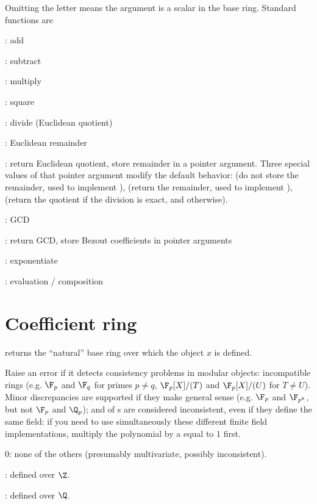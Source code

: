 \noindent Omitting the letter means the argument is a scalar in the base
ring. Standard functions  are

  : add

  : subtract

  : multiply

  : square

  : divide (Euclidean quotient)

  : Euclidean remainder

  : return Euclidean quotient, store remainder in a pointer
argument. Three special values of that pointer argument modify the default
behavior:  (do not store the remainder, used to implement
),  (return the remainder, used to implement
),  (return the quotient if the division is exact,
and  otherwise).

  : GCD

  : return GCD, store Bezout coefficients in pointer arguments

  : exponentiate

  : evaluation / composition

\section{Coefficient ring}

 returns
the ``natural'' base ring over which the object $x$ is defined.

Raise an error if it detects consistency problems in modular objects:
incompatible rings (e.g. $\F_p$ and $\F_q$ for primes $p\neq q$,
$\F_p[X]/(T)$ and $\F_p[X]/(U)$ for $T\neq U$). Minor discrepancies are
supported if they make general sense (e.g. $\F_p$ and $\F_{p^k}$, but not
$\F_p$ and $\Q_p$);  and  of s are
considered inconsistent, even if they define the same field: if you need to
use simultaneously these different finite field implementations, multiply the
polynomial by a  equal to $1$ first.

\item 0: none of the others (presumably multivariate, possibly inconsistent).

\item {}: defined over $\Z$.

\item {}: defined over $\Q$.

